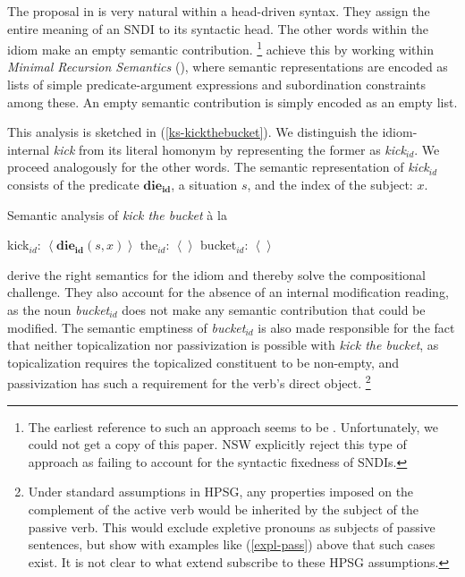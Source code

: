 \documentclass[output=paper]{langsci/langscibook}
\begin{document}
The proposal in \cite{kaysagidioms} is very natural within a head-driven syntax. They assign the entire meaning of an SNDI to its syntactic head. The other words within the idiom make an empty semantic contribution.%
\footnote{The earliest reference to such an approach seems to be \cite{Ruhl:75}. Unfortunately, we could not get a copy of this paper. NSW explicitly reject this type of approach as failing to account for the syntactic fixedness of SNDIs.}
\cite{kaysagidioms} achieve this by working within  \emph{Minimal Recursion Semantics} (\citealt{Copestake:al:95,copestake2005mrs}), where semantic representations are encoded as lists of simple predicate-argument expressions and subordination constraints among these. An empty semantic contribution is simply encoded as an empty list.

This analysis is sketched in (\ref{ks-kickthebucket}). We distinguish the idiom-internal \textit{kick} from its literal homonym by representing the former as \textit{kick$_{id}$}. We proceed analogously for the other words. The semantic representation of \textit{kick$_{id}$} consists of the predicate $\mathbf{die_{id}}$, a situation $s$, and the index of the subject: $x$.

\begin{exe}
\ex Semantic analysis of \textit{kick the bucket} \`a la \cite{kaysagidioms}\label{ks-kickthebucket}
\begin{xlist}
\ex kick$_{id}$: $\left< \mathbf{die_{id}}(s,x) \right>$
\ex the$_{id}$: $\left<  \right>$
\ex bucket$_{id}$: $\left<  \right>$
\end{xlist}
\end{exe}

\cite{kaysagidioms} derive the right semantics for the idiom and thereby solve the compositional challenge. They also account for the absence of an internal modification reading, as the noun \textit{bucket$_{id}$} does not make any semantic contribution that could be modified. The semantic emptiness of \textit{bucket$_{id}$} is also made responsible for the fact that neither  topicalization nor passivization is possible with \textit{kick the bucket}, as topicalization requires the topicalized constituent to be non-empty, and   passivization has such a requirement for the verb's direct object.%
\footnote{Under standard assumptions in HPSG, any properties imposed on the complement of the active verb would be inherited by the subject of the passive verb. This would exclude expletive pronouns as subjects of passive sentences, but \cite{kaysagidioms} show with 
examples like (\ref{expl-pass}) above that such cases exist. It is not clear to what extend \cite{kaysagidioms} subscribe to these HPSG assumptions.}
\end{document}
